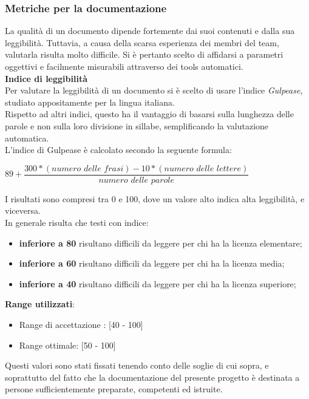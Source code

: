 \subsubsection{Metriche per la documentazione}
La qualit\`a di un documento dipende fortemente dai suoi contenuti e dalla sua leggibilit\`a. Tuttavia, a causa della scarsa esperienza dei membri del team, valutarla risulta molto difficile. Si \`e pertanto scelto di affidarsi a parametri oggettivi e facilmente misurabili attraverso dei tools automatici.\\

\textbf{Indice di leggibilit\`a}\\

Per valutare la leggibilit\`a di un documento si \`e scelto di usare l'indice \textit{Gulpease}, studiato appositamente per la lingua italiana.\\
Rispetto ad altri indici, questo ha il vantaggio di basarsi sulla lunghezza delle parole e non sulla loro divisione in sillabe, semplificando la valutazione automatica.\\
L'indice di Gulpease è calcolato secondo la seguente formula:
\begin{center}
\begin{math}
	89 + 
		\dfrac	{300 * (\textit{numero delle frasi}) - 10 * (\textit{numero delle lettere})}
				{\textit{numero delle parole}}
\end{math}
\end{center}
I risultati sono compresi tra 0 e 100, dove un valore alto indica alta leggibilit\`a, e viceversa. \\
In generale risulta che testi con indice:
\begin{itemize}
	\item \textbf{inferiore a 80} risultano difficili da leggere per chi ha la licenza elementare;
	\item \textbf{inferiore a 60} risultano difficili da leggere per chi ha la licenza media;
	\item \textbf{inferiore a 40} risultano difficili da leggere per chi ha la licenza superiore;
\end{itemize}
\textbf{Range utilizzati}:
\begin{itemize}
	\item Range di accettazione : [40 - 100]
	\item Range ottimale: [50 - 100]
\end{itemize}
Questi valori sono stati fissati tenendo conto delle soglie di cui sopra, e soprattutto del fatto che la documentazione del presente progetto \`e destinata a persone sufficientemente preparate, competenti ed istruite.

